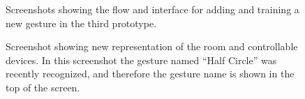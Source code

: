 \begin{figure}[!htb]
{    }
    \caption{Screenshots showing the flow and interface for adding and training a new gesture in the third prototype.}
    \label{fig:prototype3-gesture-screenshots}
\end{figure}

\begin{figure}[!htb]%
    \centering
    \caption{Screenshot showing new representation of the room and controllable devices. In this screenshot the gesture named ``Half Circle'' was recently recognized, and therefore the gesture name is shown in the top of the screen.}
    \label{fig:prototype3-room-screenshot}
\end{figure}

